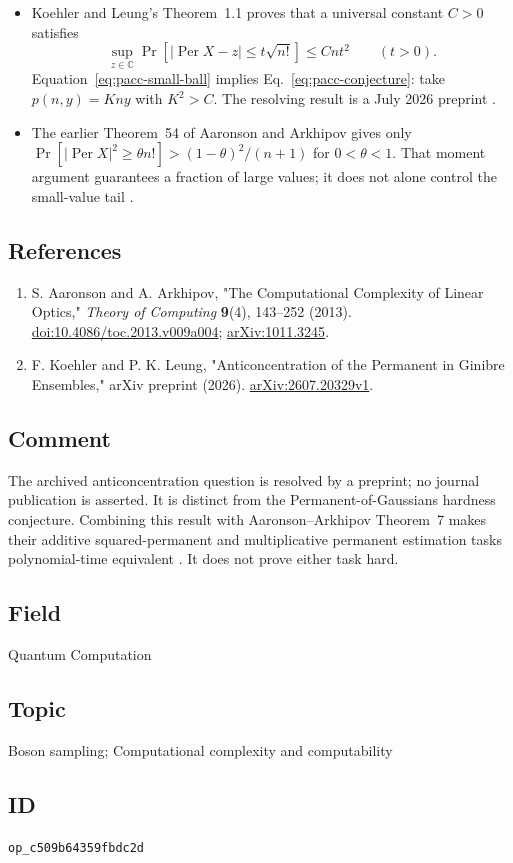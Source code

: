 \begin{itemize}
  \item Koehler and Leung's Theorem~1.1 proves that a universal constant $C>0$ satisfies
\begin{equation}
 \sup_{z\in\mathbb C}\Pr\!\left[
 |\operatorname{Per}X-z|\leq t\sqrt{n!}\right]\leq Cnt^2
 \qquad(t>0).
 \label{eq:pacc-small-ball}
\end{equation}
Equation~\eqref{eq:pacc-small-ball} implies Eq.~\eqref{eq:pacc-conjecture}: take $p(n,y)=Kny$ with $K^2>C$.
The resolving result is a July 2026 preprint .

  \item The earlier Theorem~54 of Aaronson and Arkhipov gives only
$\Pr[|\operatorname{Per}X|^2\geq\theta n!]>(1-\theta)^2/(n+1)$ for $0<\theta<1$.
That moment argument guarantees a fraction of large values; it does not alone control the small-value tail .
\end{itemize}

\subsection*{References}

\begin{enumerate}[label={},leftmargin=4.8em,labelsep=0.5em]
  \footnotesize
  \item[\textup{[AA13]}]\label{ref:pacc-aa}
  S. Aaronson and A. Arkhipov, "The Computational Complexity of Linear Optics," \emph{Theory of Computing} \textbf{9}(4), 143--252 (2013). \href{https://doi.org/10.4086/toc.2013.v009a004}{doi:10.4086/toc.2013.v009a004}; \href{https://arxiv.org/abs/1011.3245}{arXiv:1011.3245}.

  \item[\textup{[KL26]}]\label{ref:pacc-kl}
  F. Koehler and P. K. Leung, "Anticoncentration of the Permanent in Ginibre Ensembles," arXiv preprint (2026). \href{https://arxiv.org/abs/2607.20329v1}{arXiv:2607.20329v1}.
\end{enumerate}

\subsection*{Comment}

The archived anticoncentration question is resolved by a preprint; no journal publication is asserted.
It is distinct from the Permanent-of-Gaussians hardness conjecture.
Combining this result with Aaronson--Arkhipov Theorem~7 makes their additive squared-permanent and multiplicative permanent estimation tasks polynomial-time equivalent .
It does not prove either task hard.

\subsection*{Field}

Quantum Computation

\subsection*{Topic}

Boson sampling; Computational complexity and computability

\subsection*{ID}

\texttt{op\_c509b64359fbdc2d}
